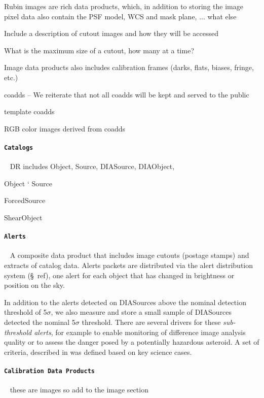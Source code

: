 Rubin images  are rich data products, which, in addition to storing the image pixel data also contain the PSF model, WCS and mask plane, ... what else

Include a description of cutout images and how they will be accessed

What is the maximum size of a cutout, how many at a time?

Image data products also includes   calibration frames (darks, flats, biases, fringe, etc.) 

coadds -- We reiterate that not all coadds will be kept and served to the public

template coadds

RGB color images derived from coadds	


\paragraph {\tt  Catalogs}~
DR includes Object, Source, DIASource, DIAObject,

Object
`
Source 

ForcedSource

ShearObject

\paragraph {\tt  Alerts}~
A composite data product that includes image cutouts (postage stamps) and extracts of catalog data.
Alerts packets are distributed via the alert distribution system (\S~ref), one alert for each object that 	has changed in brightness or position on the sky.



In addition to the alerts detected on DIASources above the nominal detection threshold of 5$\sigma$, we  also measure and store a small sample of DIASources detected the nominal 5$\sigma$ threshold.
There are several drivers  for these \emph{sub-threshold alerts}, for example to enable monitoring of difference image analysis quality or to assess the danger posed by a potentially hazardous asteroid.
A set of criteria, described in \citep{dmtn-228}  was defined  based on key science cases.


\paragraph {\tt  Calibration Data Products} ~
these are images so add to the image section

